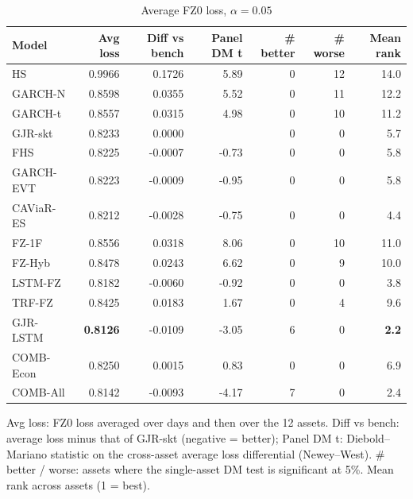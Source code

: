 \begin{table}[htbp]
\centering
\footnotesize
\caption{Average FZ0 loss, $\alpha=0.05$}
\label{tab:loss_a050}
\begin{tabular}{lrrrrrr}
\toprule
Model & Avg loss & Diff vs bench & Panel DM t & \# better & \# worse & Mean rank \\
\midrule
HS & 0.9966 & 0.1726 & 5.89 & 0 & 12 & 14.0 \\
GARCH-N & 0.8598 & 0.0355 & 5.52 & 0 & 11 & 12.2 \\
GARCH-t & 0.8557 & 0.0315 & 4.98 & 0 & 10 & 11.2 \\
GJR-skt & 0.8233 & 0.0000 &  & 0 & 0 & 5.7 \\
FHS & 0.8225 & -0.0007 & -0.73 & 0 & 0 & 5.8 \\
GARCH-EVT & 0.8223 & -0.0009 & -0.95 & 0 & 0 & 5.8 \\
CAViaR-ES & 0.8212 & -0.0028 & -0.75 & 0 & 0 & 4.4 \\
FZ-1F & 0.8556 & 0.0318 & 8.06 & 0 & 10 & 11.0 \\
FZ-Hyb & 0.8478 & 0.0243 & 6.62 & 0 & 9 & 10.0 \\
LSTM-FZ & 0.8182 & -0.0060 & -0.92 & 0 & 0 & 3.8 \\
TRF-FZ & 0.8425 & 0.0183 & 1.67 & 0 & 4 & 9.6 \\
GJR-LSTM & \textbf{0.8126} & -0.0109 & -3.05 & 6 & 0 & \textbf{2.2} \\
COMB-Econ & 0.8250 & 0.0015 & 0.83 & 0 & 0 & 6.9 \\
COMB-All & 0.8142 & -0.0093 & -4.17 & 7 & 0 & 2.4 \\
\bottomrule
\end{tabular}
\par\smallskip\parbox{\linewidth}{\scriptsize Avg loss: FZ0 loss averaged over days and then over the 12 assets. Diff vs bench: average loss minus that of GJR-skt (negative = better); Panel DM t: Diebold--Mariano statistic on the cross-asset average loss differential (Newey--West). \# better / worse: assets where the single-asset DM test is significant at 5\%. Mean rank across assets (1 = best).}
\end{table}